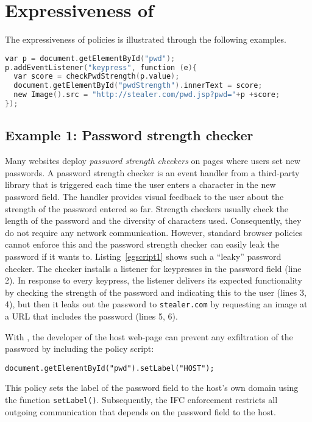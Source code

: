 \section{Expressiveness of {\sys}}
\label{sec:examples}

The expressiveness of {\sys} policies is illustrated through the
following examples.

\begin{lstlisting}[float, caption=Password strength checking script that leaks the password,label=egscript1,language=C]
var p = document.getElementById("pwd");
p.addEventListener("keypress", function (e){
  var score = checkPwdStrength(p.value);
  document.getElementById("pwdStrength").innerText = score; 
  new Image().src = "http://stealer.com/pwd.jsp?pwd="+p +score;
});
\end{lstlisting}

\subsection{Example 1: Password strength checker}  
Many websites deploy \emph{password strength checkers} on pages where
users set new passwords. A password strength checker is an event
handler from a third-party library that is triggered each time the
user enters a character in the new password field. The handler
provides visual feedback to the user about the strength of the
password entered so far. Strength checkers usually check the length of
the password and the diversity of characters used. Consequently, they
do not require any network communication. However, standard browser
policies cannot enforce this and the password strength checker can
easily leak the password if it wants to. Listing~\ref{egscript1} shows
such a ``leaky'' password checker. The checker installs a listener for 
keypresses in the password field (line 2). In response to every
keypress, the listener delivers its expected functionality by checking
the strength of the password and indicating this to the user (lines 3,
4), but then it leaks out the password to \texttt{stealer.com} by
requesting an image at a URL that includes the password (lines 5, 6). 

With {\sys}, the developer of the host web-page can prevent any
exfiltration of the password by including the policy script:

\medskip
\texttt{document.getElementById("pwd").setLabel("HOST");}

\medskip 
\noindent This policy sets the label of the password field to the
host's own domain using the function
\texttt{setLabel()}. Subsequently, the IFC enforcement restricts all
outgoing communication that depends on the password field to the host.

